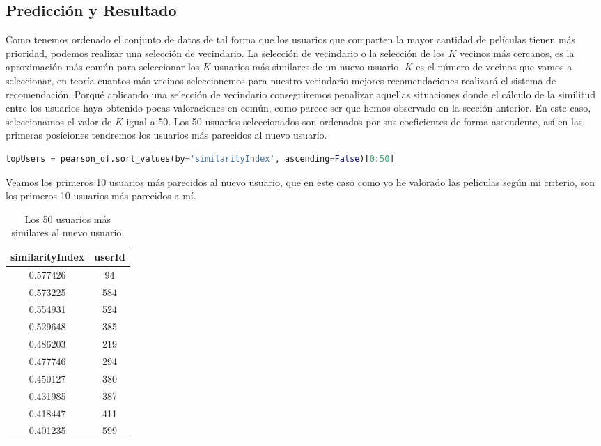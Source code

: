 \documentclass{uimppracticas}
\begin{document}
\subsection{Predicción y Resultado}\label{resultados}

Como tenemos ordenado el conjunto de datos de tal forma que los usuarios que comparten la mayor cantidad de películas tienen más prioridad, podemos realizar una selección de vecindario. La selección de vecindario o la selección de los $K$ vecinos más cercanos, es la aproximación más común para seleccionar los $K$ usuarios más similares de un nuevo usuario. $K$ es el número de vecinos que vamos a seleccionar, en teoría cuantos más vecinos seleccionemos para nuestro vecindario mejores recomendaciones realizará el sistema de recomendación. Porqué aplicando una selección de vecindario conseguiremos penalizar aquellas situaciones donde el cálculo de la similitud entre los usuarios haya obtenido pocas valoraciones en común, como parece ser que hemos observado en la sección anterior. En este caso, seleccionamos el valor de $K$ igual a 50. Los 50 usuarios seleccionados son ordenados por sus coeficientes de forma ascendente, así en las primeras posiciones tendremos los usuarios más parecidos al nuevo usuario.

\begin{lstlisting}[language=python, basicstyle=\footnotesize, belowskip=-0.5 \baselineskip]
topUsers = pearson_df.sort_values(by='similarityIndex', ascending=False)[0:50]
\end{lstlisting}

Veamos los primeros 10 usuarios más parecidos al nuevo usuario, que en este caso como yo he valorado las películas según mi criterio, son los primeros 10 usuarios más parecidos a mí.

\begin{table}[h]
	\centering
	\begin{tabular}{cc}
		\toprule
		similarityIndex &  userId \\
		\midrule
		0.577426 &      94 \\
		0.573225 &     584 \\
		0.554931 &     524 \\
		0.529648 &     385 \\
		0.486203 &     219 \\
		0.477746 &     294 \\
		0.450127 &     380 \\
		0.431985 &     387 \\
		0.418447 &     411 \\
		0.401235 &     599 \\
		\bottomrule
	\end{tabular}
	\caption{Los 50 usuarios más similares al nuevo usuario.}
	\label{top_50}
\end{table}
\end{document}
